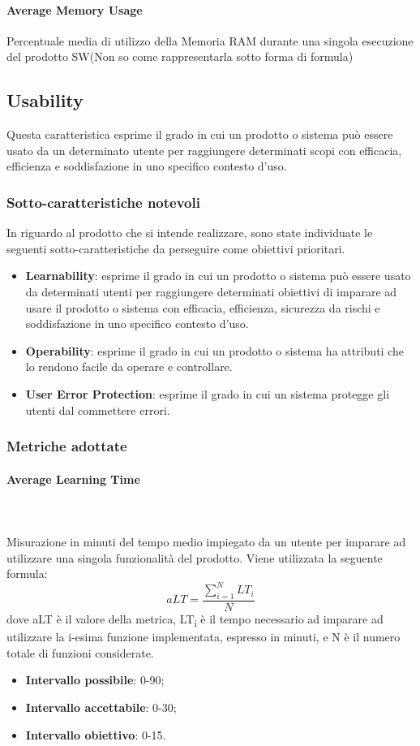 \paragraph{Average Memory Usage}
\begin{flushleft}
Percentuale media di utilizzo della Memoria RAM durante una singola esecuzione del prodotto SW(Non so come rappresentarla sotto forma di formula)
\end{flushleft}

\subsection{Usability}
Questa caratteristica esprime il grado in cui un prodotto o sistema può essere usato da un determinato utente per raggiungere determinati scopi con efficacia, efficienza e soddisfazione in uno specifico contesto d'uso.
\subsubsection{Sotto-caratteristiche notevoli}
In riguardo al prodotto che si intende realizzare, sono state individuate le seguenti sotto-caratteristiche da perseguire come obiettivi prioritari.
\begin{itemize}
	\item{\textbf{Learnability}}: esprime il grado in cui un prodotto o sistema può essere usato da determinati utenti per raggiungere determinati obiettivi di imparare ad usare il prodotto o sistema  con efficacia, efficienza, sicurezza da rischi e soddisfazione in uno specifico contesto d'uso.
	\item{\textbf{Operability}}: esprime il grado in cui un prodotto o sistema ha attributi che lo rendono facile da operare e controllare.
	\item{\textbf{User Error Protection}}: esprime il grado in cui un sistema protegge gli utenti dal commettere errori.
\end{itemize}
\subsubsection{Metriche adottate}
\paragraph{Average Learning Time}  ~\\ ~\\
Misurazione in minuti del tempo medio impiegato da un utente per imparare ad utilizzare una singola funzionalità del prodotto. Viene utilizzata la seguente formula:
$$aLT=\frac{\sum\limits_{i=1}^N{LT_i}}{N}$$
dove aLT è il valore della metrica, LT\textsubscript{i} è il tempo necessario ad imparare ad utilizzare la i-esima funzione implementata, espresso in minuti, e N è il numero totale di funzioni considerate.
\begin{itemize}
	\item{\textbf{Intervallo possibile}: 0-90;}
	\item{\textbf{Intervallo accettabile}: 0-30;}
	\item{\textbf{Intervallo obiettivo}: 0-15.}
\end{itemize}

